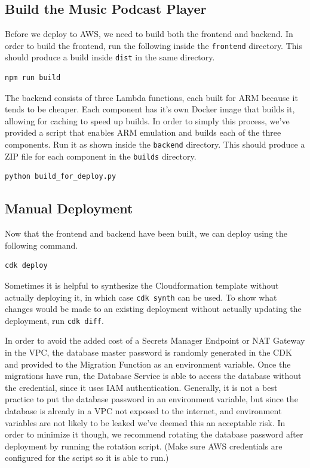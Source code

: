 \documentclass{article}
\begin{document}
\subsection{Build the Music Podcast Player}

Before we deploy to AWS, we need to build both the frontend and backend. In order to
build the frontend, run the following inside the \verb|frontend| directory. This should
produce a build inside \verb|dist| in the same directory.

\begin{verbatim}
npm run build
\end{verbatim}

The backend consists of three Lambda functions, each built for ARM because it tends to be
cheaper. Each component has it's own Docker image that builds it, allowing for caching to
speed up builds. In order to simply this process, we've provided a script that enables
ARM emulation and builds each of the three components. Run it as shown inside the 
\verb|backend| directory. This should produce a ZIP file for each component in the 
\verb|builds| directory.

\begin{verbatim}
python build_for_deploy.py
\end{verbatim}

\subsection{Manual Deployment}
Now that the frontend and backend have been built, we can deploy using the following 
command.

\begin{verbatim}
cdk deploy
\end{verbatim}

Sometimes it is helpful to synthesize the Cloudformation template without actually
deploying it, in which case \verb|cdk synth| can be used. To show what changes would be
made to an existing deployment without actually updating the deployment, run
\verb|cdk diff|.

In order to avoid the added cost of a Secrets Manager Endpoint or NAT Gateway in the VPC,
the database master password is randomly generated in the CDK and provided to the 
Migration Function as an environment variable. Once the migrations have run, the Database
Service is able to access the database without the credential, since it uses IAM
authentication. Generally, it is not a best practice to put the database password in an
environment variable, but since the database is already in a VPC not exposed to the 
internet, and environment variables are not likely to be leaked we've deemed this an 
acceptable risk. In order to minimize it though, we recommend rotating the database 
password after deployment by running the rotation script. (Make sure AWS credentials are
configured for the script so it is able to run.)
\end{document}
